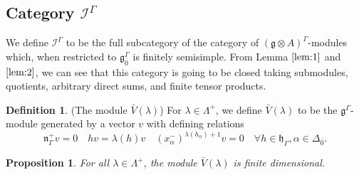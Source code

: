 \documentclass[11pt]{amsart}
\theoremstyle{plain}
\newtheorem{prop}[thm]{Proposition}
\theoremstyle{definition}
\newtheorem{defn}[thm]{Definition}
\newcommand{\g}{\mathfrak{g}}
\newcommand{\h}{\mathfrak{h}}
\newcommand{\n}{\mathfrak{n}}
\begin{document}
 \subsection{Category $\mathcal{I}^\Gamma$}\label{sub:1}
 We define $\mathcal{I}^\Gamma$ to be the full subcategory of the category of $(\g\otimes A)^\Gamma$-modules which, when restricted to $\g_{\bar{0}}^{\Gamma}$ is finitely semisimple. From Lemma $\ref{lem:1}$ and $\ref{lem:2}$, we can see that this category is going to be closed taking submodules, quotients, arbitrary direct sums, and finite tensor products.
 \begin{defn}(The module $\bar{V}(\lambda)$)
     For $\lambda\in \Lambda^+$, we define $\bar{V}(\lambda)$ to be the $\g^{\Gamma}$-module generated by a vector $v$ with defining relations
     \begin{equation}\label{eq:1}
         \n^+_{\Gamma}v=0 \quad hv=\lambda(h)v \quad (x_{\alpha}^{-})^{\lambda(h_\alpha)+1}v=0 \quad \forall h\in \h_{\Gamma}, \alpha \in \Delta_{\bar{0}}.
     \end{equation}
\end{defn}
\begin{prop}
For all $\lambda \in \Lambda^+$, the module $\bar{V}(\lambda)$ is finite dimensional.
 \end{prop}
\end{document}
